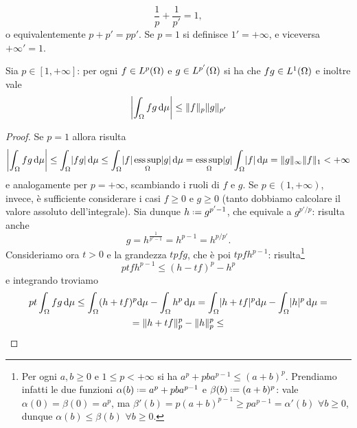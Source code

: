 \begin{equation}
    \frac1{p}+\frac1{p'}=1,
    \label{eq:coniugato-holder}
\end{equation}
o equivalentemente $p+p'=pp'$.
Se $p=1$ si definisce $1'=+\infty$, e viceversa $+\infty'=1$.
\begin{proprieta} \label{pr:disuguaglianza-holder}
    Sia $p\in[1,+\infty]$: per ogni $f\in\leb[p]{\Omega}$ e $g\in\leb[p']{\Omega}$ si ha che $fg\in\leb[1]{\Omega}$ e inoltre vale
    \begin{equation}
        \abs[\bigg]{\int_\Omega fg\,\dd\mu} \le \norm{f}_p\norm{g}_{p'}
        \label{eq:disuguaglianza-holder}
    \end{equation}
\end{proprieta}
\begin{proof}
    Se $p=1$ allora risulta
    \begin{equation}
        \abs[\bigg]{\int_\Omega fg\,\dd\mu}\le
        \int_\Omega\abs{fg}\,\dd\mu\le
        \int_\Omega\abs{f}\esssup_\Omega\abs{g}\,\dd\mu=
        \esssup_\Omega\abs{g}\int_\Omega\abs{f}\,\dd\mu=
        \norm{g}_\infty\norm{f}_1<+\infty
    \end{equation}
    e analogamente per $p=+\infty$, scambiando i ruoli di $f$ e $g$.
    Se $p\in(1,+\infty)$, invece, è sufficiente considerare i casi $f\ge 0$ e $g\ge 0$ (tanto dobbiamo calcolare il valore assoluto dell'integrale).
    Sia dunque $h\defeq g^{p'-1}$, che equivale a $g^{p'/p}$: risulta anche
    \begin{equation}
        g=h^{\frac1{p'-1}}=h^{p-1}=h^{p/p'}.
    \end{equation}
    Consideriamo ora $t>0$ e la grandezza $tpfg$, che è poi $tpfh^{p-1}$: risulta\footnote{
        Per ogni $a,b\ge 0$ e $1\le p<+\infty$ si ha $a^p+pba^{p-1}\le(a+b)^p$.
        Prendiamo infatti le due funzioni $\alpha(b)\defeq a^p+pba^{p-1}$ e $\beta(b)\defeq (a+b)^p$: vale $\alpha(0)=\beta(0)=a^p$, ma $\beta'(b)=p(a+b)^{p-1}\ge pa^{p-1}=\alpha'(b)$ $\forall b\ge 0$, dunque $\alpha(b)\le\beta(b)$ $\forall b\ge 0$.
    }
    \begin{equation}
        ptfh^{p-1} \le (h-tf)^p-h^p
    \end{equation}
    e integrando troviamo
    \begin{multline}
        pt\int_\Omega fg\,\dd\mu\le
        \int_\Omega (h+tf)^p\dd\mu-\int_\Omega h^p\,\dd\mu=
        \int_\Omega \abs{h+tf}^p\dd\mu-\int_\Omega \abs{h}^p\,\dd\mu=\\=
        \norm{h+tf}_p^p-\norm{h}_p^p\le

\end{multline}
\end{proof}
